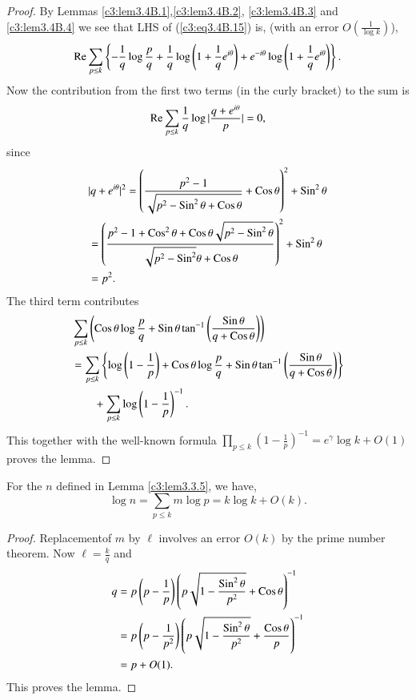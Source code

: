\begin{proof}
By Lemmas \ref{c3:lem3.4B.1},\pageoriginale \ref{c3:lem3.4B.2}, \ref{c3:lem3.4B.3} and \ref{c3:lem3.4B.4} we see that LHS of (\ref{c3:eq3.4B.15}) is, (with an error $O(\frac{1}{\log k})$),
$$
\operatorname{Re} \sum\limits_{p\leq k} \left\{ -\frac{1}{q} \log \frac{p}{q} + \frac{1}{q} \log \left( 1+ \frac{1}{q} e^{i\theta} \right) + e^{-i\theta} \log \left(1+ \frac{1}{q} e^{i\theta} \right)\right\}.
$$
Now the contribution from the first two terms (in the curly bracket) to the sum is
$$
\operatorname{Re} \sum\limits_{p \leq k} \frac{1}{q} \log |\frac{q+e^{i\theta}}{p}| = 0, 
$$
since
\begin{align*}
& |q+ e^{i\theta}|^2 = \left( \frac{p^2-1}{\sqrt{p^2- \operatorname{Sin}^2 \theta + \operatorname{Cos} \theta}} + \operatorname{Cos} \theta\right)^2 + \operatorname{Sin}^2 \theta\\
& = \left( \frac{p^2 -1 + \operatorname{Cos}^2 \theta + \operatorname{Cos} \theta \sqrt{p^2 -\operatorname{Sin}^2 \theta}}{\sqrt{p^2 - \operatorname{Sin}^2} \theta + \operatorname{Cos} \theta}\right)^2 + \operatorname{Sin}^2 \theta\\
& = p^2. 
\end{align*}
The third term contributes
\begin{align*}
& \sum\limits_{p\leq k} \left( \operatorname{Cos} \theta \log \frac{p}{q} + \operatorname{Sin} \theta \tan^{-1} \left( \frac{\operatorname{Sin} \theta}{q + \operatorname{Cos} \theta} \right)\right)\\
& = \sum\limits_{p\leq k} \left\{\log \left(1-\frac{1}{p} \right) + \operatorname{Cos}  \theta \log \frac{p}{q} + \operatorname{Sin} \theta \tan^{-1} \left( \frac{\operatorname{Sin} \theta}{ q + \operatorname{Cos} \theta}\right)\right\}\\
&\qquad {} + \sum\limits_{p\leq k} \log \left(1-\frac{1}{p} \right)^{-1}.
\end{align*} 
This together with the well-known formula $\prod\limits_{p\leq k} \left( 1-\frac{1}{p}\right)^{-1} = e^{\gamma} \log k + O(1)$ proves the lemma.
\end{proof}

\begin{alphlemma}\label{c3:lem3.4B.7}
For the $n$ defined in Lemma \ref{c3:lem3.3.5}, we have,
\begin{equation*}
  \log n =\sum\limits_{p\leq k} m \log p = k \log k + O(k). \tag{3.4B.16}\label{c3:eq3.4B.16}
\end{equation*}
\end{alphlemma}

\begin{proof}
Replacement\pageoriginale of $m$ by $\ell$ involves an error $O(k)$ by the prime number theorem. Now $\ell =\frac{k}{q}$ and
\begin{align*}
q & = p \left(p-\frac{1}{p} \right) \left(p\sqrt{1-\frac{\operatorname{Sin}^2 \theta}{p^2}} + \operatorname{Cos} \theta\right)^{-1}\\
& = p \left(p-\frac{1}{p^2} \right) \left(p\sqrt{1-\frac{\operatorname{Sin}^2 \theta}{p^2}} + \frac{\operatorname{Cos} \theta}{p} \right)^{-1}\\
& = p + O(1).
\end{align*}
This proves the lemma.
\end{proof}

